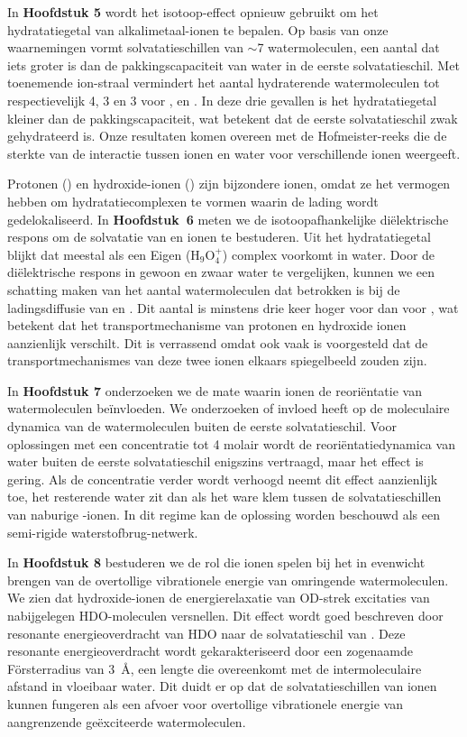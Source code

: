 In \textbf {Hoofdstuk 5} wordt het isotoop-effect opnieuw gebruikt om het hydratatiegetal van alkalimetaal-ionen te bepalen. Op basis van onze waarnemingen vormt  solvatatieschillen van $\sim$7 watermoleculen, een aantal dat iets groter is dan de pakkingscapaciteit van water in de eerste solvatatieschil. Met toenemende ion-straal vermindert het aantal hydraterende watermoleculen tot respectievelijk 4, 3 en 3 voor ,  en . In deze drie gevallen is het hydratatiegetal kleiner dan de pakkingscapaciteit, wat betekent dat de eerste solvatatieschil zwak gehydrateerd is. Onze resultaten komen overeen met de Hofmeister-reeks die de sterkte van de interactie tussen ionen en water voor verschillende ionen weergeeft.


Protonen () en hydroxide-ionen () zijn bijzondere ionen, omdat ze het vermogen hebben om hydratatiecomplexen te vormen waarin de lading wordt gedelokaliseerd. In \textbf{Hoofdstuk~6} meten we de isotoopafhankelijke di\"{e}lektrische respons om de solvatatie van  en  ionen te bestuderen. Uit het hydratatiegetal \mbox{blijkt} dat  meestal als een Eigen (H$_9$O$_4^+$) complex voorkomt in water. Door de di\"{e}lektrische respons in gewoon en zwaar water te vergelijken, kunnen we een schatting maken van het aantal watermoleculen dat betrokken is bij de ladingsdiffusie van  en . Dit aantal is minstens drie keer hoger voor  dan voor , wat betekent dat het transportmechanisme van protonen en hydroxide ionen aanzienlijk verschilt. Dit is verrassend omdat ook vaak is voorgesteld dat de transportmechanismes van deze twee ionen elkaars spiegelbeeld zouden zijn.


In \textbf{Hoofdstuk 7} onderzoeken we de mate waarin  ionen de reori\"{e}ntatie van watermoleculen be\"{i}nvloeden. We onderzoeken of  invloed heeft op de moleculaire dynamica van de watermoleculen buiten de eerste solvatatieschil. Voor oplossingen met een  concentratie tot 4 molair wordt de reori\"{e}ntatiedynamica van water buiten de eerste solvatatieschil enigszins vertraagd, maar het effect is gering. Als de  concentratie verder wordt verhoogd neemt dit effect aanzienlijk toe, het resterende water zit dan als het ware klem tussen de solvatatieschillen van naburige -ionen. In dit regime kan de oplossing worden beschouwd als een semi-rigide waterstofbrug-netwerk.


In \textbf{Hoofdstuk 8} bestuderen we de rol die  ionen spelen bij het in evenwicht brengen van de overtollige vibrationele energie van omringende watermoleculen. We zien dat hydroxide-ionen de energierelaxatie van OD-strek excitaties van nabijgelegen HDO-moleculen versnellen. Dit effect wordt goed beschreven door resonante energieoverdracht van HDO naar de solvatatieschil van . Deze resonante energieoverdracht wordt gekarakteriseerd door een zogenaamde F\"{o}rsterradius van 3~\AA, een lengte die overeenkomt met de intermoleculaire afstand in vloeibaar water. Dit duidt er op dat de solvatatieschillen van  ionen kunnen fungeren als een afvoer voor overtollige vibrationele energie van aangrenzende ge\"{e}xciteerde watermoleculen.


